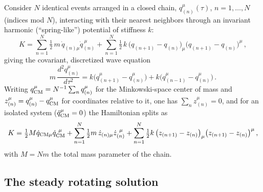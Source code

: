 \documentclass[11pt]{article}
\begin{document}
Consider $N$ identical events arranged in a closed chain, $q_{(n)}^\mu(\tau)$,
$n=1,\dots,N$ (indices mod $N$), interacting with their nearest neighbors
through an invariant harmonic (``spring-like'') potential of stiffness $k$:
\begin{equation}
K=\sum_{n=1}^{N}\tfrac12\,m\,\dot q_{(n)\mu}\dot q_{(n)}^{\ \mu}
+\sum_{n=1}^{N}\tfrac12\,k\,\big(q_{(n+1)}-q_{(n)}\big)_\mu\big(q_{(n+1)}-q_{(n)}\big)^\mu\,,
\label{eq:chainK}
\end{equation}
giving the covariant, discretized wave equation
\begin{equation}
m\,\frac{d^2q_{(n)}^\mu}{d\tau^2}=k\big(q_{(n+1)}^\mu-q_{(n)}^\mu\big)+k\big(q_{(n-1)}^\mu-q_{(n)}^\mu\big)\,.
\label{eq:chainEOM}
\end{equation}
Writing $q_{\rm CM}^\mu=N^{-1}\sum_n q_{(n)}^\mu$ for the Minkowski-space
center of mass and $z_{(n)}^\mu=q_{(n)}^\mu-q_{\rm CM}^\mu$ for coordinates
relative to it, one has $\sum_n z_{(n)}^\mu=0$, and for an isolated system
($\ddot q_{\rm CM}^\mu=0$) the Hamiltonian splits as
\begin{equation}
K=\tfrac12 M\dot q_{{\rm CM}\mu}\dot q_{\rm CM}^{\ \mu}
+\sum_{n=1}^N\tfrac12 m\,\dot z_{(n)\mu}\dot z_{(n)}^{\ \mu}
+\sum_{n=1}^N\tfrac12 k\,\big(z_{(n+1)}-z_{(n)}\big)_\mu\big(z_{(n+1)}-z_{(n)}\big)^\mu\,,
\label{eq:chainKsplit}
\end{equation}
with $M=Nm$ the total mass parameter of the chain.

\subsection{The steady rotating solution}
\label{sec:steady}
\end{document}
